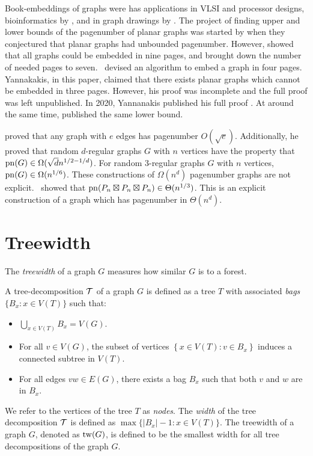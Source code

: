 Book-embeddings of graphs were has applications in VLSI and processor designs, bioinformatics by \textcite{haslingerRNAStructuresPseudoknots1999}, and in graph drawings by \textcite{woodBoundedDegreeBook2002}. 
The project of finding upper and lower bounds of the pagenumber of planar graphs was started by \textcite{bernhartBookThicknessGraph1979} when they conjectured that planar graphs had unbounded pagenumber. However, \textcite{bussPagenumberPlanarGraphs1984} showed that all graphs could be embedded in nine pages, and \textcite{heathEmbeddingPlanarGraphs1984} brought down the number of needed pages to seven.\ \textcite{yannakakisEmbeddingPlanarGraphs1989} devised an algorithm to embed a graph in four pages. Yannakakis, in this paper, claimed that there exists planar graphs which cannot be embedded in three pages. However, his proof was incomplete and the full proof was left unpublished. In 2020, Yannanakis published his full proof \cite{yannakakisPlanarGraphsThat2020}. At around the same time, \textcite{kaufmannFourPagesAre2020} published the same lower bound.

\textcite{malitzGraphsEdgesHave1994} proved that any graph with $e$ edges has pagenumber $O(\sqrt{e})$. Additionally, he proved that random $d$-regular graphs $G$ with $n$ vertices have the property that $\operatorname{pn}(G) \in \Omega(\sqrt{d} n^{1/2 - 1/d})$. For random 3-regular graphs $G$ with $n$ vertices, $\operatorname{pn}(G) \in \Omega(n^{1/6})$. These constructions of $\Omega(n^d)$ pagenumber graphs are not explicit.\ \textcite{eppsteinThreeDimensionalGraphProducts2024} showed that $\operatorname{pn}(P_n \boxtimes P_n \boxtimes P_n) \in \Theta(n^{1/3})$. This is an explicit construction of a graph which has pagenumber in $\Theta(n^{d})$. 
\section{Treewidth}\label{sec:treewidth}
The \textit{treewidth} of a graph \(G\) measures how similar $G$ is to a forest.

\begin{definition}\label{def:tree-decomposition}
	A tree-decomposition \(\mathcal{T}\) of a graph \(G\) is defined as a tree \(T\) with associated \textit{bags} \(\lbrace B_x : x \in V(T) \rbrace\) such that:
	\begin{itemize}
		\item $\bigcup_{x \in V(T)} B_x = V(G)$.
		\item For all \(v \in V(G)\), the subset of vertices \(\left\lbrace x \in V(T): v \in B_x \right\rbrace\) induces a connected subtree in \(V(T)\).
		\item For all edges \(vw \in E(G)\), there exists a bag \(B_x\) such that both \(v\) and \(w\) are in \(B_x\).
	\end{itemize}
\end{definition}
We refer to the vertices of the tree \(T\) as \textit{nodes}.
The \textit{width} of the tree decomposition \(\mathcal{T}\) is defined as \(\max \lbrace |B_x| - 1 : x \in V(T) \rbrace\).
The treewidth of a graph \(G\), denoted as \(\operatorname{tw}(G)\), is defined to be the smallest width for all tree decompositions of the graph \(G\).

